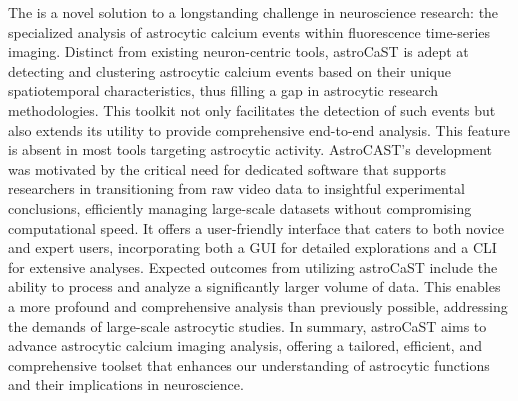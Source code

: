 The  is a novel solution to a longstanding challenge in neuroscience research: the specialized analysis of astrocytic calcium events within fluorescence time-series imaging. Distinct from existing neuron-centric tools, \ac{astroCaST} is adept at detecting and clustering astrocytic calcium events based on their unique spatiotemporal characteristics, thus filling a gap in astrocytic research methodologies. This toolkit not only facilitates the detection of such events but also extends its utility to provide comprehensive end-to-end analysis. This feature is absent in most tools targeting astrocytic activity. AstroCAST's development was motivated by the critical need for dedicated software that supports researchers in transitioning from raw video data to insightful experimental conclusions, efficiently managing large-scale datasets without compromising computational speed. It offers a user-friendly interface that caters to both novice and expert users, incorporating both a \ac{GUI} for detailed explorations and a \ac{CLI} for extensive analyses. Expected outcomes from utilizing \ac{astroCaST} include the ability to process and analyze a significantly larger volume of data. This enables a more profound and comprehensive analysis than previously possible, addressing the demands of large-scale astrocytic studies. In summary, \ac{astroCaST} aims to advance astrocytic calcium imaging analysis, offering a tailored, efficient, and comprehensive toolset that enhances our understanding of astrocytic functions and their implications in neuroscience.